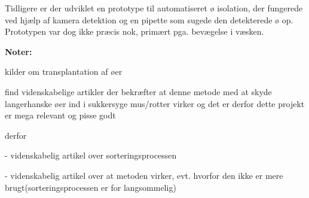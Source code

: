 Tidligere er der udviklet en prototype til automatiseret ø isolation, der fungerede ved hjælp af kamera detektion og en pipette som sugede den detekterede ø op. Prototypen var dog ikke præcis nok, primært pga. bevægelse i væsken. 
 

\textbf{Noter:}

kilder om transplantation af øer


 
 
 find videnskabelige artikler der bekræfter at denne metode med at skyde langerhanske øer ind i sukkersyge mus/rotter virker og det er derfor dette projekt er mega relevant og pisse godt
 
 derfor
 
 - videnskabelig artikel over sorteringsprocessen
 
 - videnskabelig artikel over at metoden virker, evt. hvorfor den ikke er mere brugt(sorteringsprocessen er for langsommelig)

